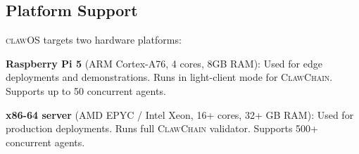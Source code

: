 \documentclass{article}
\newcommand{\clawos}{\textsc{clawOS}}
\newcommand{\clawchain}{\textsc{ClawChain}}
\begin{document}
\subsection{Platform Support}

\clawos{} targets two hardware platforms:

\textbf{Raspberry Pi 5} (ARM Cortex-A76, 4 cores, 8GB RAM): Used for edge deployments and demonstrations. Runs in light-client mode for \clawchain{}. Supports up to 50 concurrent agents.

\textbf{x86-64 server} (AMD EPYC / Intel Xeon, 16+ cores, 32+ GB RAM): Used for production deployments. Runs full \clawchain{} validator. Supports 500+ concurrent agents.

\end{document}
